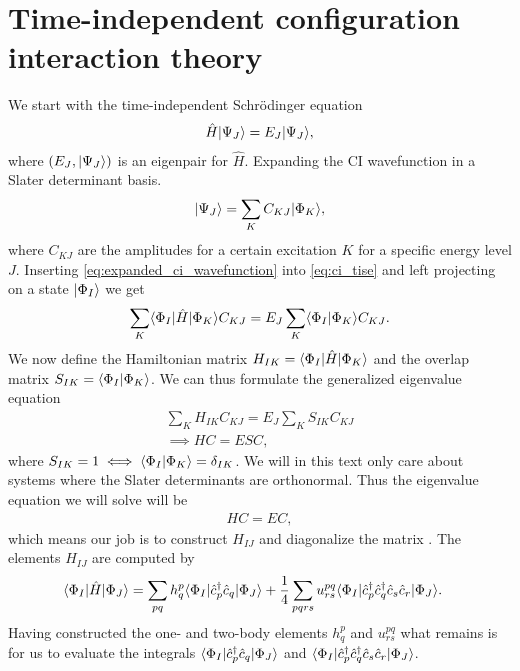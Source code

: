      \section{Time-independent configuration interaction theory}
        We start with the time-independent Schrödinger equation
        \begin{align}
            \hat{H}| \Psi_J \rangle = E_J| \Psi_J \rangle,
            \label{eq:ci_tise}
        \end{align}
        where $(E_J, | \Psi_J \rangle)$ is an eigenpair for $\hat{H}$. Expanding the
        CI wavefunction in a Slater determinant basis.
        \begin{align}
            | \Psi_J \rangle = \sum_{K} C_{KJ}| \Phi_K \rangle,
            \label{eq:expanded_ci_wavefunction}
        \end{align}
        where $C_{KJ}$ are the amplitudes for a certain excitation $K$ for a
        specific energy level $J$. Inserting
        \autoref{eq:expanded_ci_wavefunction} into \autoref{eq:ci_tise} and left
        projecting on a state $| \Phi_I \rangle$ we get
        \begin{align}
            \sum_{K}\langle \Phi_I |\hat{H}| \Phi_K \rangle C_{KJ}
            = E_J\sum_{K}\langle \Phi_I | \Phi_K \rangle C_{KJ}.
        \end{align}
        We now define the Hamiltonian matrix $H_{IK} =
        \langle \Phi_I |\hat{H}| \Phi_K \rangle$ and the overlap matrix $S_{IK} =
        \langle \Phi_I | \Phi_K \rangle$. We can thus formulate the generalized
        eigenvalue equation
        \begin{gather}
            \sum_{K}H_{IK}C_{KJ} = E_J\sum_{K}S_{IK}C_{KJ}
            \\
            \implies
            HC = ESC,
        \end{gather}
        where $S_{IK} = 1 \iff \langle \Phi_I | \Phi_K \rangle = \delta_{IK}$. We will
        in this text only care about systems where the Slater determinants are
        orthonormal. Thus the eigenvalue equation we will solve will be
        \begin{align}
            HC = EC,
        \end{align}
        which means our job is to construct $H_{IJ}$ and diagonalize the
        matrix \cite{karwowski}. The elements $H_{IJ}$ are computed by
        \begin{align}
            \langle \Phi_I |\hat{H}| \Phi_J \rangle
            &= \sum_{pq}h^{p}_{q}
            \langle \Phi_I |\hat{c}_{p}^{\dagger}\hat{c}_{q}| \Phi_J \rangle
            + \frac{1}{4}\sum_{pqrs}u^{pq}_{rs}
            \langle \Phi_I |\hat{c}_{p}^{\dagger}\hat{c}_{q}^{\dagger}\hat{c}_{s}\hat{c}_{r}| \Phi_J \rangle.
        \end{align}
        Having constructed the one- and two-body elements $h^{p}_{q}$ and
        $u^{pq}_{rs}$ what remains is for us to evaluate the integrals
        $\langle \Phi_I |\hat{c}_{p}^{\dagger}\hat{c}_{q}| \Phi_J \rangle$ and
        $\langle \Phi_I |\hat{c}_{p}^{\dagger}\hat{c}_{q}^{\dagger}\hat{c}_{s}\hat{c}_{r}| \Phi_J \rangle$.

